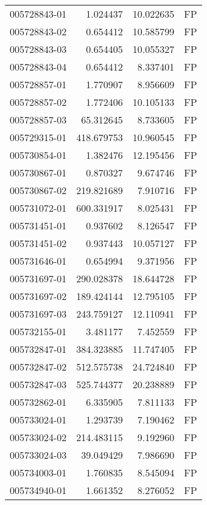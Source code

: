 \begin{tabular}{lrrl}
005728843-01 &    1.024437 &      10.022635 &   FP \\
005728843-02 &    0.654412 &      10.585799 &   FP \\
005728843-03 &    0.654405 &      10.055327 &   FP \\
005728843-04 &    0.654412 &       8.337401 &   FP \\
005728857-01 &    1.770907 &       8.956609 &   FP \\
005728857-02 &    1.772406 &      10.105133 &   FP \\
005728857-03 &   65.312645 &       8.733605 &   FP \\
005729315-01 &  418.679753 &      10.960545 &   FP \\
005730854-01 &    1.382476 &      12.195456 &   FP \\
005730867-01 &    0.870327 &       9.674746 &   FP \\
005730867-02 &  219.821689 &       7.910716 &   FP \\
005731072-01 &  600.331917 &       8.025431 &   FP \\
005731451-01 &    0.937602 &       8.126547 &   FP \\
005731451-02 &    0.937443 &      10.057127 &   FP \\
005731646-01 &    0.654994 &       9.371956 &   FP \\
005731697-01 &  290.028378 &      18.644728 &   FP \\
005731697-02 &  189.424144 &      12.795105 &   FP \\
005731697-03 &  243.759127 &      12.110941 &   FP \\
005732155-01 &    3.481177 &       7.452559 &   FP \\
005732847-01 &  384.323885 &      11.747405 &   FP \\
005732847-02 &  512.575738 &      24.724840 &   FP \\
005732847-03 &  525.744377 &      20.238889 &   FP \\
005732862-01 &    6.335905 &       7.811133 &   FP \\
005733024-01 &    1.293739 &       7.190462 &   FP \\
005733024-02 &  214.483115 &       9.192960 &   FP \\
005733024-03 &   39.049429 &       7.986690 &   FP \\
005734003-01 &    1.760835 &       8.545094 &   FP \\
005734940-01 &    1.661352 &       8.276052 &   FP \\

\end{tabular}
